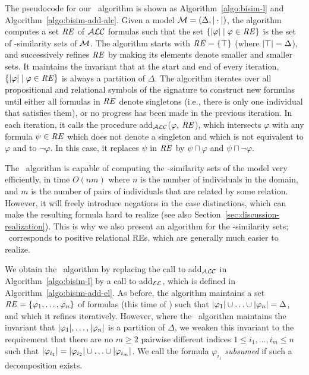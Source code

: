 The pseudocode for our \alc\ algorithm is shown as
Algorithm~\ref{algo:bisim-l} and Algorithm~\ref{algo:bisim-add-alc}.
Given a model $\mathcal{M}=(\Delta, |\cdot|)$, the algorithm computes a
set $\mathit{RE}$ of $\mathcal{ALC}$ formulas such that the set $\{|\varphi|
\mid \varphi \in \mathit{RE}\}$ is the set of \alc-similarity sets of $\mathcal{M}$.
The algorithm starts with $\mathit{RE} = \{\top\}$ (where $|\top| =
\Delta$), and successively refines $\mathit{RE}$ by making its elements denote
smaller and smaller sets.  It maintains the invariant that at the
start and end of every iteration, $\{|\varphi| \mid \varphi \in
\mathit{RE}\}$ is always a partition of $\Delta$.  The algorithm iterates over
all propositional and relational symbols of the signature to construct
new formulas until either all formulas in $\mathit{RE}$ denote singletons
(i.e., there is only one individual that satisfies them), or no
progress has been made in the previous iteration.  In each iteration,
it calls the procedure add$_\mathcal{ALC}$($\varphi$, $\mathit{RE}$), which intersects
$\varphi$ with any formula $\psi \in \mathit{RE}$ which does not denote a
singleton and which is not equivalent to $\varphi$ and to $\neg
\varphi$. In this case, it replaces $\psi$ in $\mathit{RE}$ by $\psi \sqcap
\varphi$ and $\psi \sqcap \neg \varphi$.



The \alc\ algorithm is capable of computing the \alc-similarity sets
of the model very efficiently, in time $O(nm)$ where $n$ is the number
of individuals in the domain, and $m$ is the number of pairs of
individuals that are related by some relation.  However, it will
freely introduce negations in the case distinctions, which can make
the resulting formula hard to realize (see also
Section~\ref{sec:discussion-realization}).  This is why we also
present an algorithm for the \el-similarity sets; \el\ corresponds to
positive relational REs, which are generally much easier to realize.

We obtain the \el\ algorithm by replacing the call to add$_{\mathcal{ALC}}$ in
Algorithm~\ref{algo:bisim-l} by a call to add$_{\mathcal{EL}}$, which is
defined in Algorithm~\ref{algo:bisim-add-el}.  As before, the
algorithm maintains a set $\mathit{RE} = \{\varphi_1,\ldots,\varphi_n\}$ of
formulas (this time of \el) such that $|\varphi_1| \cup \ldots
\cup |\varphi_n| = \Delta$, and which it refines iteratively.
However, where the \alc\ algorithm maintains the invariant that
$|\varphi_1|,\ldots,|\varphi_n|$ is a partition of
$\Delta$, we weaken this invariant to the requirement that there are
no $m \geq 2$ pairwise different indices $1 \leq i_1,\ldots,i_m \leq
n$ such that $|\varphi_{i_1}| = |\varphi_{i_2}| \cup
\ldots \cup |\varphi_{i_m}|$.  We call the formula
$\varphi_{i_1}$ \emph{subsumed} if such a decomposition exists.

